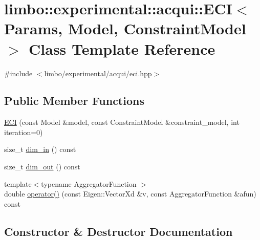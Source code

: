 \hypertarget{classlimbo_1_1experimental_1_1acqui_1_1_e_c_i}{}\section{limbo\+:\+:experimental\+:\+:acqui\+:\+:E\+C\+I$<$ Params, Model, Constraint\+Model $>$ Class Template Reference}
\label{classlimbo_1_1experimental_1_1acqui_1_1_e_c_i}


{\ttfamily \#include $<$limbo/experimental/acqui/eci.\+hpp$>$}

\subsection*{Public Member Functions}
\begin{DoxyCompactItemize}
\item 
\hyperlink{classlimbo_1_1experimental_1_1acqui_1_1_e_c_i_a96864d920ef5f6206a033407eda297a7}{E\+C\+I} (const Model \&model, const Constraint\+Model \&constraint\+\_\+model, int iteration=0)
\item 
size\+\_\+t \hyperlink{classlimbo_1_1experimental_1_1acqui_1_1_e_c_i_a5ed54a0381396ba52665decfdfdb9fe3}{dim\+\_\+in} () const 
\item 
size\+\_\+t \hyperlink{classlimbo_1_1experimental_1_1acqui_1_1_e_c_i_ab3ac302f62852bcd2167534de92a15fd}{dim\+\_\+out} () const 
\item 
{\footnotesize template$<$typename Aggregator\+Function $>$ }\\double \hyperlink{classlimbo_1_1experimental_1_1acqui_1_1_e_c_i_abd4322f84039e546bc0b9f803f3f97cc}{operator()} (const Eigen\+::\+Vector\+Xd \&v, const Aggregator\+Function \&afun) const 
\end{DoxyCompactItemize}


\subsection{Constructor \& Destructor Documentation}
\hypertarget{classlimbo_1_1experimental_1_1acqui_1_1_e_c_i_a96864d920ef5f6206a033407eda297a7}{}
